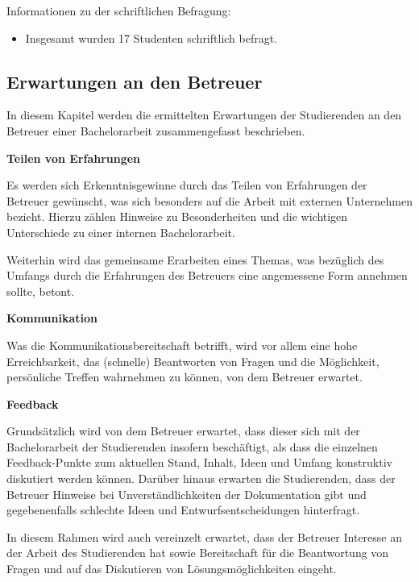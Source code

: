 \documentclass[bibliography=totoc,listof=totoc,BCOR=5mm,DIV=12,oneside]{scrbook}
\begin{document}
\label{sub:studentenchriftlichErgebnisse}
\par \bigskip Informationen zu der schriftlichen Befragung:
\begin{itemize}
\item Insgesamt wurden 17 Studenten schriftlich befragt.
\end{itemize}

\subsection{Erwartungen an den Betreuer}
\par In diesem Kapitel werden die ermittelten Erwartungen der Studierenden an den Betreuer einer Bachelorarbeit zusammengefasst beschrieben. 

\par \bigskip \textbf{Teilen von Erfahrungen}
\par Es werden sich Erkenntnisgewinne durch das Teilen von Erfahrungen der Betreuer gewünscht, was sich besonders auf die Arbeit mit externen Unternehmen bezieht. Hierzu zählen Hinweise zu Besonderheiten und die wichtigen Unterschiede zu einer internen Bachelorarbeit. 
\par Weiterhin wird das gemeinsame Erarbeiten eines Themas, was bezüglich des Umfangs durch die Erfahrungen des Betreuers eine angemessene Form annehmen sollte, betont.

\par \bigskip \textbf{Kommunikation}
\par Was die Kommunikationsbereitschaft betrifft, wird vor allem eine hohe Erreichbarkeit, das (schnelle) Beantworten von Fragen und die Möglichkeit, persönliche Treffen wahrnehmen zu können, von dem Betreuer erwartet.

\par \bigskip \textbf{Feedback}
\par Grundsätzlich wird von dem Betreuer erwartet, dass dieser sich mit der Bachelorarbeit der Studierenden insofern beschäftigt, als dass die einzelnen Feedback-Punkte zum aktuellen Stand, Inhalt, Ideen und Umfang konstruktiv diskutiert werden können. Darüber hinaus erwarten die Studierenden, dass der Betreuer Hinweise bei Unverständlichkeiten der Dokumentation gibt und gegebenenfalls schlechte Ideen und Entwurfsentscheidungen hinterfragt.
\par In diesem Rahmen wird auch vereinzelt erwartet, dass der Betreuer Interesse an der Arbeit des Studierenden hat sowie Bereitschaft für die Beantwortung von Fragen und auf das Diskutieren von Lösungsmöglichkeiten eingeht.
\end{document}

